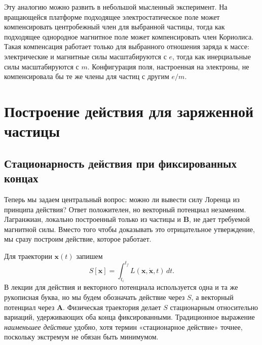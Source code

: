 \begin{classroomqa}
\end{classroomqa}

Эту аналогию можно развить в небольшой мысленный эксперимент. На вращающейся платформе подходящее электростатическое поле может компенсировать центробежный член для выбранной частицы, тогда как подходящее однородное магнитное поле может компенсировать член Кориолиса. Такая компенсация работает только для выбранного отношения заряда к массе: электрические и магнитные силы масштабируются с \(e\), тогда как инерциальные силы масштабируются с \(m\). Конфигурация поля, настроенная на электроны, не компенсировала бы те же члены для частиц с другим \(e/m\).

\section{Построение действия для заряженной частицы}

\subsection{Стационарность действия при фиксированных концах}

Теперь мы задаем центральный вопрос: можно ли вывести силу Лоренца из принципа действия? Ответ положителен, но векторный потенциал незаменим. Лагранжиан, локально построенный только из частицы и \(\mathbf B\), не дает требуемой магнитной силы. Вместо того чтобы доказывать это отрицательное утверждение, мы сразу построим действие, которое работает.

Для траектории \(\mathbf x(t)\) запишем
\begin{equation}
  S[\mathbf x]
  =
  \int_{t_i}^{t_f}L(\mathbf x,\dot{\mathbf x},t)\,dt.
\end{equation}
В лекции для действия и векторного потенциала используется одна и та же рукописная буква, но мы будем обозначать действие через \(S\), а векторный потенциал через \(\mathbf A\). Физическая траектория делает \(S\) стационарным относительно вариаций, удерживающих оба конца фиксированными. Традиционное выражение \emph{наименьшее действие} удобно, хотя термин «стационарное действие» точнее, поскольку экстремум не обязан быть минимумом.

